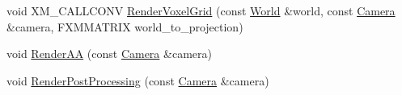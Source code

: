 \begin{DoxyCompactItemize}
\item 
void X\+M\+\_\+\+C\+A\+L\+L\+C\+O\+NV \hyperlink{classmage_1_1rendering_1_1_renderer_1_1_impl_adb7265bf1333368a57e5071ef3f56fca}{Render\+Voxel\+Grid} (const \hyperlink{classmage_1_1rendering_1_1_world}{World} \&world, const \hyperlink{classmage_1_1rendering_1_1_camera}{Camera} \&camera, F\+X\+M\+M\+A\+T\+R\+IX world\+\_\+to\+\_\+projection)
\item 
void \hyperlink{classmage_1_1rendering_1_1_renderer_1_1_impl_a6fffbc6a0de26d1a41a94998cdb98f20}{Render\+AA} (const \hyperlink{classmage_1_1rendering_1_1_camera}{Camera} \&camera)
\item 
void \hyperlink{classmage_1_1rendering_1_1_renderer_1_1_impl_ae4d71c1e7ec4412983d1728337767b3c}{Render\+Post\+Processing} (const \hyperlink{classmage_1_1rendering_1_1_camera}{Camera} \&camera)
\end{DoxyCompactItemize}
